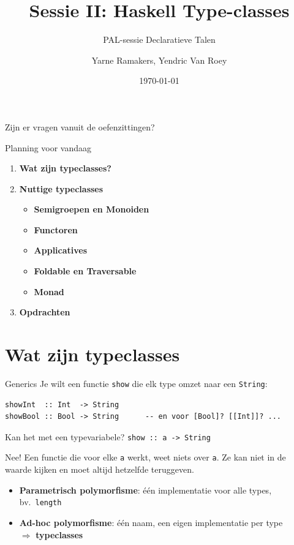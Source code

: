 \documentclass[aspectratio=169,11pt]{beamer}
\title{Sessie II: Haskell Type-classes}
\subtitle{PAL-sessie Declaratieve Talen}
\author{Yarne Ramakers, Yendric Van Roey}
\institute{KU Leuven}
\date{\today}
\newcommand{\hs}{\lstinline[style=hsinline]}
\begin{document}
 
\maketitle

\begin{frame}[standout]
  Zijn er vragen vanuit de oefenzittingen?
\end{frame}

\begin{frame}{Planning voor vandaag}
  \begin{enumerate}
    \item \textbf{Wat zijn typeclasses?}
    \item \textbf{Nuttige typeclasses}
    \begin{itemize}
      \item \textbf{Semigroepen en Monoiden}
      \item \textbf{Functoren}
      \item \textbf{Applicatives}
      \item \textbf{Foldable en Traversable}
      \item \textbf{Monad}
    \end{itemize}
    \item \textbf{Opdrachten}
  \end{enumerate}
\end{frame}

\section{Wat zijn typeclasses}

\begin{frame}[fragile]{Generics}
  Je wilt een functie \hs{show} die elk type omzet naar een \hs{String}:
\begin{lstlisting}
showInt  :: Int  -> String
showBool :: Bool -> String      -- en voor [Bool]? [[Int]]? ...
\end{lstlisting}
  \pause
  Kan het met een typevariabele? \hs{show :: a -> String}
  \pause
 
  Nee! Een functie die voor \alert{elke} \hs{a} werkt, weet niets over \hs{a}.
  Ze kan niet in de waarde kijken en moet altijd hetzelfde teruggeven.
  \pause
  \begin{itemize}
    \item \textbf{Parametrisch polymorfisme}: één implementatie voor alle types, bv.\ \hs{length}
    \item \textbf{Ad-hoc polymorfisme}: één naam, een \alert{eigen} implementatie per type\\
      $\Rightarrow$ \textbf{typeclasses}
  \end{itemize}
\end{frame}
\end{document}
